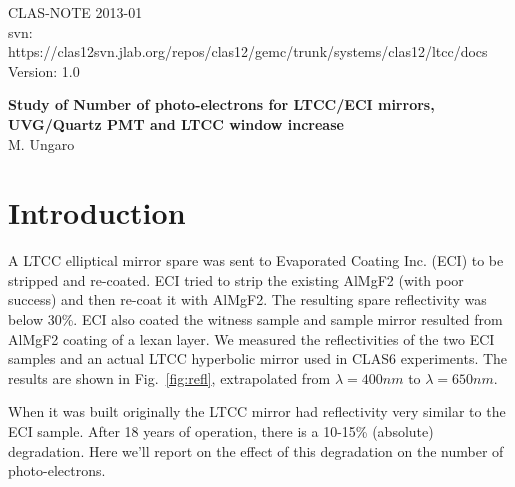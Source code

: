 \documentclass{article}
\begin{document}
\pagestyle{fancy}
\renewcommand{\sectionmark}[1]{\markright{\slshape \thesection\ #1}{}}
\fancyhead[R]{\bf\rightmark}

\begin{flushright}
CLAS-NOTE 2013-01\\
{\small svn: https://clas12svn.jlab.org/repos/clas12/gemc/trunk/systems/clas12/ltcc/docs }\\
Version: 1.0
\end{flushright}

\vspace{1.6cm}

\begin{center}
{\Large \bf Study of Number of photo-electrons for LTCC/ECI mirrors,  UVG/Quartz PMT and LTCC window increase} \hfill \\
\vspace{0.6cm}
{  M. Ungaro} \hfill
\end{center}
\vspace{0.6cm}






\section{Introduction}

A LTCC elliptical mirror spare was sent to Evaporated Coating Inc. (ECI) to be stripped and re-coated. ECI tried to strip the existing AlMgF2 
(with poor success) and then re-coat it with AlMgF2. The resulting spare reflectivity was below 30\%. 
ECI also coated the witness sample and sample mirror resulted from AlMgF2 coating of a lexan layer.
We measured the reflectivities of the two ECI samples and an actual LTCC hyperbolic mirror used in CLAS6 experiments.
The results \cite{bib:andrew} are shown in Fig.~\ref{fig:refl}, extrapolated from $\lambda=400nm$  to $\lambda=650nm$.

When it was built originally the LTCC mirror had reflectivity very similar to the ECI sample. 
After 18 years of operation, there is a 10-15\% (absolute) degradation. Here we'll report on 
the effect of this degradation on the number of photo-electrons.
\end{document}
